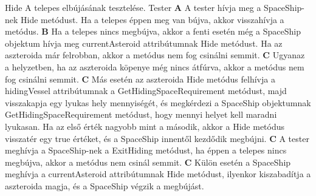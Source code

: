 \documentclass[../../projlab]{subfiles}
\begin{document}
\begin{use-case}
    {Hide}
    {A telepes elbújásának tesztelése.}
    {Tester} 
    \textbf{A} A tester hívja meg a SpaceShip-nek Hide metódust. Ha a telepes éppen meg van bújva, akkor visszahívja a metódus. \newline
    \textbf{B} Ha a telepes nincs megbújva, akkor a fenti esetén még a SpaceShip objektum hívja meg currentAsteroid attribútumnak Hide metódust. Ha az aszteroida már felrobban, akkor a metódus nem fog csinálni semmit. \newline
    \textbf{C} Ugyanaz a helyzetben, ha az aszteroida köpenye még nincs átfúrva, akkor a metódus nem fog csinálni semmit. \newline
    \textbf{C} Más esetén az aszteroida Hide metódus felhívja a hidingVessel attribútumnak a GetHidingSpaceRequirement metódust, majd visszakapja egy lyukas hely mennyiségét, és megkérdezi a SpaceShip objektumnak GetHidingSpaceRequirement metódust, hogy mennyi helyet kell maradni lyukasan. Ha az első érték nagyobb mint a második, akkor a Hide metódus visszatér egy true értéket, és a SpaceShip innentől kezdődik megbújni. \newline
    \textbf{C} A tester meghívja a SpaceShip-nek a ExitHiding metódust, ha éppen a telepes nincs megbújva, akkor a metódus nem csinál semmit. \newline
    \textbf{C} Külön esetén a SpaceShip meghívja a currentAsteroid attribútumnak Hide metódust, ilyenkor kiszabadítja a aszteroida magja, és a SpaceShip végzik a megbújást. \newline
\end{use-case}
\end{document}
